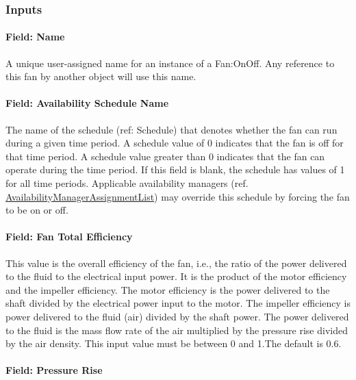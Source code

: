 \subsubsection{Inputs}\label{inputs-1-017}

\paragraph{Field: Name}\label{field-name-1-016}

A unique user-assigned name for an instance of a Fan:OnOff. Any reference to this fan by another object will use this name.

\paragraph{Field: Availability Schedule Name}\label{field-availability-schedule-name-1-005}

The name of the schedule (ref: Schedule) that denotes whether the fan can run during a given time period. A schedule value of 0 indicates that the fan is off for that time period. A schedule value greater than 0 indicates that the fan can operate during the time period. If this field is blank, the schedule has values of 1 for all time periods. Applicable availability managers (ref. \hyperref[availabilitymanagerassignmentlist]{AvailabilityManagerAssignmentList}) may override this schedule by forcing the fan to be on or off.

\paragraph{Field: Fan Total Efficiency}\label{field-fan-total-efficiency-1-000}

This value is the overall efficiency of the fan, i.e., the ratio of the power delivered to the fluid to the electrical input power. It is the product of the motor efficiency and the impeller efficiency. The motor efficiency is the power delivered to the shaft divided by the electrical power input to the motor. The impeller efficiency is power delivered to the fluid (air) divided by the shaft power. The power delivered to the fluid is the mass flow rate of the air multiplied by the pressure rise divided by the air density. This input value must be between 0 and 1.The default is 0.6.

\paragraph{Field: Pressure Rise}\label{field-pressure-rise-1}

